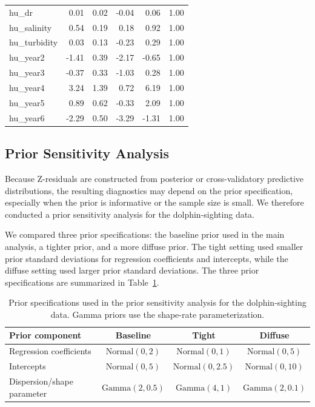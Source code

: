 \documentclass[
  12pt]{article}
\theoremstyle{plain}
\theoremstyle{definition}
\theoremstyle{remark}
\begin{document}
\begin{table}[htbp]
\begin{tabular}{lrrrrr}
hu\_dr         &  0.01  & 0.02 & -0.04 &  0.06 & 1.00 \\
hu\_salinity   &  0.54  & 0.19 &  0.18 &  0.92 & 1.00 \\
hu\_turbidity  &  0.03  & 0.13 & -0.23 &  0.29 & 1.00 \\
hu\_year2      & -1.41  & 0.39 & -2.17 & -0.65 & 1.00 \\
hu\_year3      & -0.37  & 0.33 & -1.03 &  0.28 & 1.00 \\
hu\_year4      &  3.24  & 1.39 &  0.72 &  6.19 & 1.00 \\
hu\_year5      &  0.89  & 0.62 & -0.33 &  2.09 & 1.00 \\
hu\_year6      & -2.29  & 0.50 & -3.29 & -1.31 & 1.00 \\
\bottomrule
\end{tabular}
\end{table}

\clearpage

\subsection{Prior Sensitivity Analysis}\label{prior_analysis}

Because Z-residuals are constructed from posterior or cross-validatory predictive distributions, the resulting diagnostics may depend on the prior specification, especially when the prior is informative or the sample size is small. We therefore conducted a prior sensitivity analysis for the dolphin-sighting data.

We compared three prior specifications: the baseline prior used in the main analysis, a tighter prior, and a more diffuse prior. The tight setting used smaller prior standard deviations for regression coefficients and intercepts, while the diffuse setting used larger prior standard deviations. The three prior specifications are summarized in Table~\ref{tab:prior_sensitivity_specs}. 

\begin{table}[!htbp] 
\centering 
\caption{Prior specifications used in the prior sensitivity analysis for the dolphin-sighting data. Gamma priors use the shape-rate parameterization.} 
\label{tab:prior_sensitivity_specs} 
\small 
\setlength{\tabcolsep}{6pt} 
\renewcommand{\arraystretch}{1.15} 
\begin{tabular}{lccc} 
\toprule 
Prior component & Baseline & Tight & Diffuse \\ 
\midrule 
Regression coefficients 
& $\mathrm{Normal}(0,2)$ 
& $\mathrm{Normal}(0,1)$ 
& $\mathrm{Normal}(0,5)$ \\ 
Intercepts 
& $\mathrm{Normal}(0,5)$ 
& $\mathrm{Normal}(0,2.5)$ 
& $\mathrm{Normal}(0,10)$ \\ 
Dispersion/shape parameter 
& $\mathrm{Gamma}(2,0.5)$ 
& $\mathrm{Gamma}(4,1)$ 
& $\mathrm{Gamma}(2,0.1)$ \\ 
\bottomrule 
\end{tabular} 
\end{table}
\end{document}
